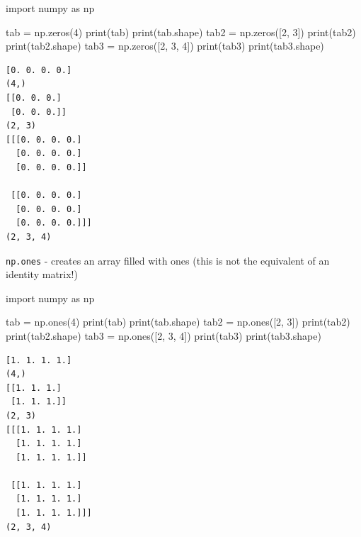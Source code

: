 \documentclass[
  english,
  letterpaper,
  DIV=11,
  numbers=noendperiod]{scrreprt}
\newenvironment{Shaded}{\begin{snugshade}}{\end{snugshade}}
\newcommand{\BuiltInTok}[1]{\textcolor[rgb]{0.00,0.23,0.31}{#1}}
\newcommand{\DecValTok}[1]{\textcolor[rgb]{0.68,0.00,0.00}{#1}}
\newcommand{\ImportTok}[1]{\textcolor[rgb]{0.00,0.46,0.62}{#1}}
\newcommand{\NormalTok}[1]{\textcolor[rgb]{0.00,0.23,0.31}{#1}}
\newcommand{\OperatorTok}[1]{\textcolor[rgb]{0.37,0.37,0.37}{#1}}
\begin{document}
\begin{Shaded}
\begin{Highlighting}[]
\ImportTok{import}\NormalTok{ numpy }\ImportTok{as}\NormalTok{ np}

\NormalTok{tab }\OperatorTok{=}\NormalTok{ np.zeros(}\DecValTok{4}\NormalTok{)}
\BuiltInTok{print}\NormalTok{(tab)}
\BuiltInTok{print}\NormalTok{(tab.shape)}
\NormalTok{tab2 }\OperatorTok{=}\NormalTok{ np.zeros([}\DecValTok{2}\NormalTok{, }\DecValTok{3}\NormalTok{])}
\BuiltInTok{print}\NormalTok{(tab2)}
\BuiltInTok{print}\NormalTok{(tab2.shape)}
\NormalTok{tab3 }\OperatorTok{=}\NormalTok{ np.zeros([}\DecValTok{2}\NormalTok{, }\DecValTok{3}\NormalTok{, }\DecValTok{4}\NormalTok{])}
\BuiltInTok{print}\NormalTok{(tab3)}
\BuiltInTok{print}\NormalTok{(tab3.shape)}
\end{Highlighting}
\end{Shaded}

\begin{verbatim}
[0. 0. 0. 0.]
(4,)
[[0. 0. 0.]
 [0. 0. 0.]]
(2, 3)
[[[0. 0. 0. 0.]
  [0. 0. 0. 0.]
  [0. 0. 0. 0.]]

 [[0. 0. 0. 0.]
  [0. 0. 0. 0.]
  [0. 0. 0. 0.]]]
(2, 3, 4)
\end{verbatim}

\texttt{np.ones} - creates an array filled with ones (this is not the
equivalent of an identity matrix!)

\begin{Shaded}
\begin{Highlighting}[]
\ImportTok{import}\NormalTok{ numpy }\ImportTok{as}\NormalTok{ np}

\NormalTok{tab }\OperatorTok{=}\NormalTok{ np.ones(}\DecValTok{4}\NormalTok{)}
\BuiltInTok{print}\NormalTok{(tab)}
\BuiltInTok{print}\NormalTok{(tab.shape)}
\NormalTok{tab2 }\OperatorTok{=}\NormalTok{ np.ones([}\DecValTok{2}\NormalTok{, }\DecValTok{3}\NormalTok{])}
\BuiltInTok{print}\NormalTok{(tab2)}
\BuiltInTok{print}\NormalTok{(tab2.shape)}
\NormalTok{tab3 }\OperatorTok{=}\NormalTok{ np.ones([}\DecValTok{2}\NormalTok{, }\DecValTok{3}\NormalTok{, }\DecValTok{4}\NormalTok{])}
\BuiltInTok{print}\NormalTok{(tab3)}
\BuiltInTok{print}\NormalTok{(tab3.shape)}
\end{Highlighting}
\end{Shaded}

\begin{verbatim}
[1. 1. 1. 1.]
(4,)
[[1. 1. 1.]
 [1. 1. 1.]]
(2, 3)
[[[1. 1. 1. 1.]
  [1. 1. 1. 1.]
  [1. 1. 1. 1.]]

 [[1. 1. 1. 1.]
  [1. 1. 1. 1.]
  [1. 1. 1. 1.]]]
(2, 3, 4)
\end{verbatim}
\end{document}
